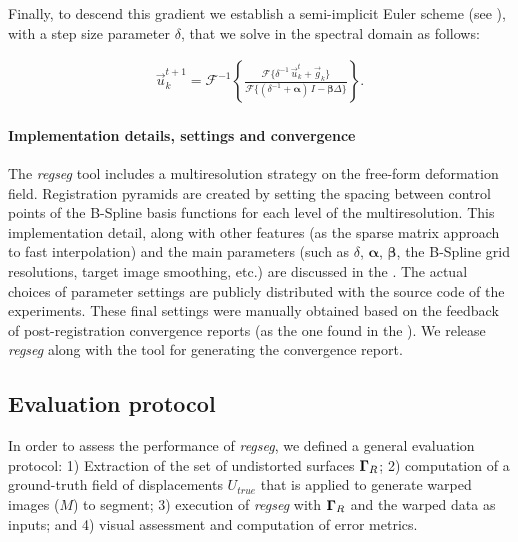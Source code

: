 Finally, to descend this gradient we establish a semi-implicit Euler scheme (see ),
  with a step size parameter $\delta$, that we solve in the spectral domain as follows:

  \begin{align}
  \vec{u}_k^{t+1} = \mathcal{F}^{-1}\left\{ \frac{\mathcal{F}\{\delta^{-1} \, \vec{u}_k^t + \vec{g}_k\} }%
                  {\mathcal{F}\{(\delta^{-1} + \boldsymbol{\alpha})\, I - \boldsymbol{\beta}\Delta\}} \right\}.
  \label{eq:update_equation}
  \end{align}


\paragraph*{Implementation details, settings and convergence}
\label{sec:conv_report}
The \emph{regseg} tool includes a multiresolution strategy on the free-form deformation field.
Registration pyramids are created by setting the spacing between control points of the B-Spline basis
  functions for each level of the multiresolution.
This implementation detail, along with other features (as the sparse matrix approach
  to fast interpolation) and the main parameters 
  (such as $\delta$, $\boldsymbol{\alpha}$, $\boldsymbol{\beta}$, the B-Spline grid resolutions,
  target image smoothing, etc.) are discussed in the .
The actual choices of parameter settings are publicly distributed with the source code of the experiments.
These final settings were manually obtained based on the feedback of post-registration convergence
  reports (as the one found in the ).
We release \emph{regseg} along with the tool for generating the convergence report.

\subsection{Evaluation protocol}\label{sec:evaluation_protocol}
In order to assess the performance of \emph{regseg}, we defined a general
  evaluation protocol:
1) Extraction of the set of undistorted surfaces $\boldsymbol{\Gamma}_R$;
2) computation of a ground-truth field of displacements $U_{true}$ that is applied to
  generate warped images ($M$) to segment;
3) execution of \emph{regseg} with $\boldsymbol{\Gamma}_R$ and the warped data as inputs; and
4) visual assessment and computation of error metrics.



